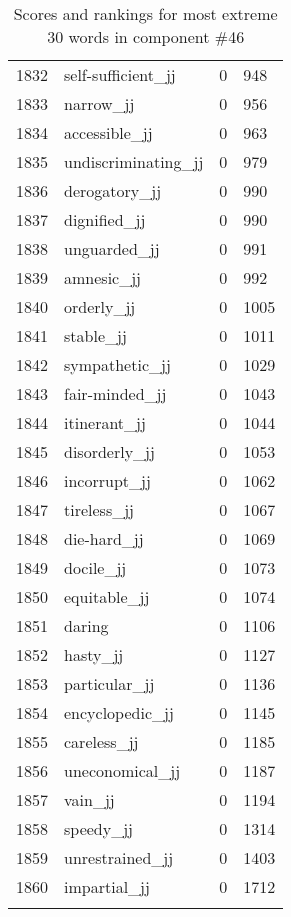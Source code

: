 \begin{longtable}[!htbp]{| rlr@{.}l |}
    1832 & self-sufficient\_jj & 0 & 948 \\
    1833 & narrow\_jj & 0 & 956 \\
    1834 & accessible\_jj & 0 & 963 \\
    1835 & undiscriminating\_jj & 0 & 979 \\
    1836 & derogatory\_jj & 0 & 990 \\
    1837 & dignified\_jj & 0 & 990 \\
    1838 & unguarded\_jj & 0 & 991 \\
    1839 & amnesic\_jj & 0 & 992 \\
    1840 & orderly\_jj & 0 & 1005 \\
    1841 & stable\_jj & 0 & 1011 \\
    1842 & sympathetic\_jj & 0 & 1029 \\
    1843 & fair-minded\_jj & 0 & 1043 \\
    1844 & itinerant\_jj & 0 & 1044 \\
    1845 & disorderly\_jj & 0 & 1053 \\
    1846 & incorrupt\_jj & 0 & 1062 \\
    1847 & tireless\_jj & 0 & 1067 \\
    1848 & die-hard\_jj & 0 & 1069 \\
    1849 & docile\_jj & 0 & 1073 \\
    1850 & equitable\_jj & 0 & 1074 \\
    1851 & daring & 0 & 1106 \\
    1852 & hasty\_jj & 0 & 1127 \\
    1853 & particular\_jj & 0 & 1136 \\
    1854 & encyclopedic\_jj & 0 & 1145 \\
    1855 & careless\_jj & 0 & 1185 \\
    1856 & uneconomical\_jj & 0 & 1187 \\
    1857 & vain\_jj & 0 & 1194 \\
    1858 & speedy\_jj & 0 & 1314 \\
    1859 & unrestrained\_jj & 0 & 1403 \\
    1860 & impartial\_jj & 0 & 1712 \\
    \hline
    \caption{Scores and rankings for most extreme 30 words in component \#46} \\
\end{longtable}
